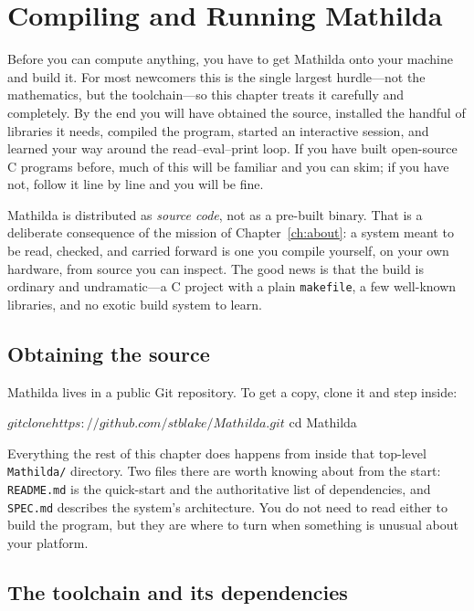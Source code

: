 \chapter{Compiling and Running Mathilda}
\label{ch:building}

Before you can compute anything, you have to get Mathilda onto your machine and
build it. For most newcomers this is the single largest hurdle---not the
mathematics, but the toolchain---so this chapter treats it carefully and
completely. By the end you will have obtained the source, installed the handful of
libraries it needs, compiled the program, started an interactive session, and
learned your way around the read--eval--print loop. If you have built open-source C
programs before, much of this will be familiar and you can skim; if you have not,
follow it line by line and you will be fine.

Mathilda is distributed as \emph{source code}, not as a pre-built binary. That is a
deliberate consequence of the mission of Chapter~\ref{ch:about}: a system meant to
be read, checked, and carried forward is one you compile yourself, on your own
hardware, from source you can inspect. The good news is that the build is ordinary
and undramatic---a C project with a plain \texttt{makefile}, a few well-known
libraries, and no exotic build system to learn.

\section{Obtaining the source}
\label{sec:obtaining}

Mathilda lives in a public Git repository. To get a copy, clone it and step
inside:

\begin{shell}
$ git clone https://github.com/stblake/Mathilda.git
$ cd Mathilda
\end{shell}

\noindent
Everything the rest of this chapter does happens from inside that top-level
\texttt{Mathilda/} directory. Two files there are worth knowing about from the
start: \texttt{README.md} is the quick-start and the authoritative list of
dependencies, and \texttt{SPEC.md} describes the system's architecture. You do not
need to read either to build the program, but they are where to turn when something
is unusual about your platform.

\section{The toolchain and its dependencies}
\label{sec:prerequisites}

